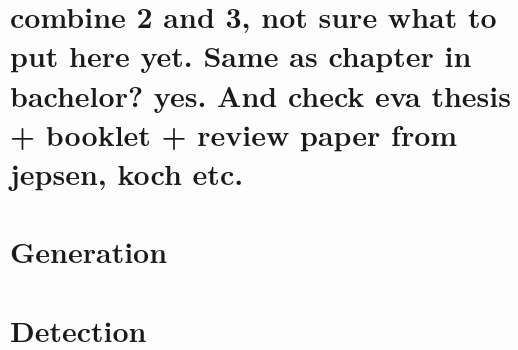 \section{combine 2 and 3, not sure what to put here yet. Same as chapter in bachelor? yes. And check eva thesis + booklet + review paper from jepsen, koch etc.}

\section{Generation}

\section{Detection}
